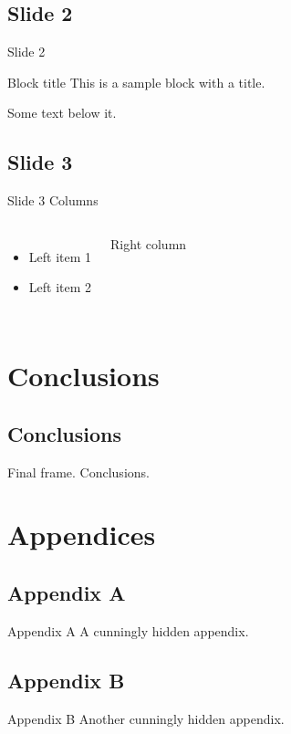 \documentclass[compress,ignorenonframetext]{beamer}
\begin{document}
\subsection{Slide 2}
\begin{frame}{Slide 2}
\begin{block}{Block title}
This is a sample block with a title.
\end{block}
Some text below it.
\end{frame}

\subsection{Slide 3}
\begin{frame}{Slide 3}
Columns
\begin{columns}
\begin{itemize}
\item Left item 1
\item Left item 2
\end{itemize}
Right column
\end{columns}
\end{frame}

\section{Conclusions}
\subsection{Conclusions}
\begin{frame}
Final frame. Conclusions.
%
\setcounter{finalframe}{\value{framenumber}}
\end{frame}

\appendix

\section{Appendices}
\subsection{Appendix A}
\begin{frame}[noframenumbering]{Appendix A}
A cunningly hidden appendix.
\end{frame}


\subsection{Appendix B}
\begin{frame}[noframenumbering]{Appendix B}
%
Another cunningly hidden appendix.
%
\setcounter{framenumber}{\value{finalframe}} %
\end{frame}
\end{document}
